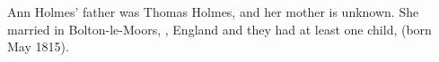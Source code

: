 
Ann Holmes' father was Thomas Holmes, and her mother is unknown.
She married  in Bolton-le-Moors, , England
and they had at least one child,  (born May 1815).
